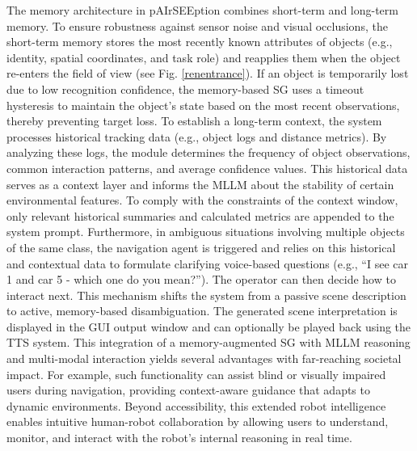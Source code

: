 \documentclass[lettersize,journal]{IEEEtran}
\begin{document}
The memory architecture in pAIrSEEption combines short-term and long-term memory. To ensure robustness against sensor noise and visual occlusions, the short-term memory stores the most recently known attributes of objects (e.g., identity, spatial coordinates, and task role) and reapplies them when the object re-enters the field of view (see Fig. \ref{renentrance}). If an object is temporarily lost due to low recognition confidence, the memory-based SG uses a timeout hysteresis to maintain the object’s state based on the most recent observations, thereby preventing target loss.
To establish a long-term context, the system processes historical tracking data (e.g., object logs and distance metrics). By analyzing these logs, the module determines the frequency of object observations, common interaction patterns, and average confidence values. This historical data serves as a context layer and informs the MLLM about the stability of certain environmental features. To comply with the constraints of the context window, only relevant historical summaries and calculated metrics are appended to the system prompt. Furthermore, in ambiguous situations involving multiple objects of the same class, the navigation agent is triggered and relies on this historical and contextual data to formulate clarifying voice-based questions (e.g., “I see car 1 and car 5 - which one do you mean?”). The operator can then decide how to interact next. This mechanism shifts the system from a passive scene description to active, memory-based disambiguation.
The generated scene interpretation is displayed in the GUI output window and can optionally be played back using the TTS system. This integration of a memory-augmented SG with MLLM reasoning and multi-modal interaction yields several advantages with far-reaching societal impact. For example, such functionality can assist blind or visually impaired users during navigation, providing context-aware guidance that adapts to dynamic environments. Beyond accessibility, this extended robot intelligence enables intuitive human-robot collaboration by allowing users to understand, monitor, and interact with the robot’s internal reasoning in real time. 

\end{document}
